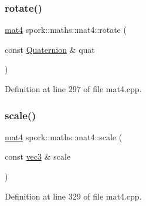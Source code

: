 \mbox{\label{structspork_1_1maths_1_1mat4_ae8eab0264126ec8bcee502727f705b2a}} 
\subsubsection{\texorpdfstring{rotate()}{rotate()}\hspace{0.1cm}{\footnotesize\ttfamily [2/2]}}
{\footnotesize\ttfamily \hyperlink{structspork_1_1maths_1_1mat4}{mat4} spork\+::maths\+::mat4\+::rotate (\begin{DoxyParamCaption}\item[{const \hyperlink{structspork_1_1maths_1_1_quaternion}{Quaternion} \&}]{quat }\end{DoxyParamCaption})\hspace{0.3cm}{\ttfamily [static]}}



Definition at line 297 of file mat4.\+cpp.

\mbox{\label{structspork_1_1maths_1_1mat4_a6d42d521e673886f906c6bef2600a5b6}} 
\subsubsection{\texorpdfstring{scale()}{scale()}}
{\footnotesize\ttfamily \hyperlink{structspork_1_1maths_1_1mat4}{mat4} spork\+::maths\+::mat4\+::scale (\begin{DoxyParamCaption}\item[{const \hyperlink{structspork_1_1maths_1_1vec3}{vec3} \&}]{scale }\end{DoxyParamCaption})\hspace{0.3cm}{\ttfamily [static]}}



Definition at line 329 of file mat4.\+cpp.

\mbox{\label{structspork_1_1maths_1_1mat4_a051931c026a2c6efe06d1884c477bbbc}} 
